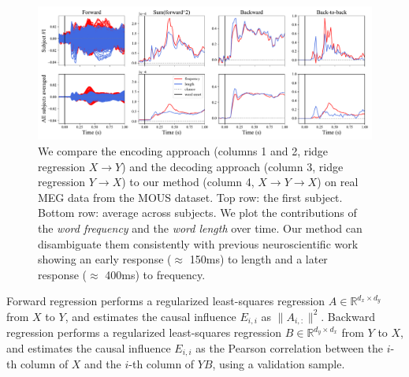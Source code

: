 \begin{figure}[t!]
  \centering
  \includegraphics[width=\textwidth, trim=0cm 0cm 0cm 0cm, clip=True]{figures/meg_twocurves.pdf}
  \caption{We compare the encoding approach (columns 1 and 2, ridge regression $X \rightarrow Y$) and the decoding approach (column 3, ridge regression $Y \rightarrow X$) to our method (column 4, $X \rightarrow Y \rightarrow X$) on real MEG data from the MOUS dataset. Top row: the first subject. Bottom row: average across subjects.
  We plot the contributions of the \textit{word frequency} and the \textit{word
  length} over time. Our method can disambiguate them consistently with
  previous neuroscientific work showing an early response ($\approx$ 150ms) to
  length and a later response ($\approx$ 400ms) to frequency.}
  \label{fig:meg_twocurves}
\end{figure}

Forward regression performs a regularized least-squares regression $A \in \mathbb{R}^{d_x \times d_y}$ from $X$ to $Y$, and estimates the causal influence $E_{i,i}$ as $\| A_{i, :} \|^2$.
%
Backward regression performs a regularized least-squares regression $B \in \mathbb{R}^{d_y \times d_x}$ from $Y$ to $X$, and estimates the causal influence $E_{i, i}$ as the Pearson correlation between the $i$-th column of $X$ and the $i$-th column of $YB$, using a validation sample.
%


